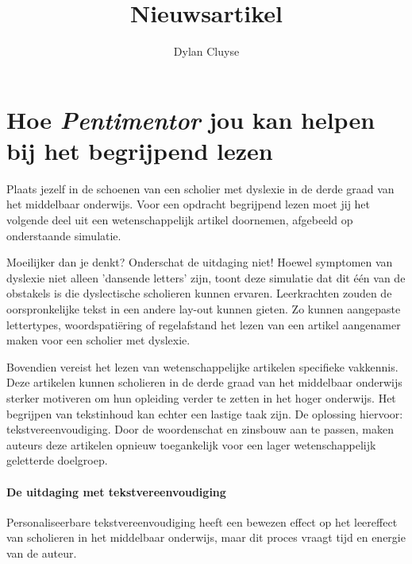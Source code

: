 \documentclass[a4paper,9pt,twoside]{report}
\title{Nieuwsartikel}
\author{Dylan {Cluyse}}
\begin{document}
	
\chapter{Hoe \textit{Pentimentor} jou kan helpen bij het begrijpend lezen}

\noindent Plaats jezelf in de schoenen van een scholier met dyslexie in de derde graad van het middelbaar onderwijs. Voor een opdracht begrijpend lezen moet jij het volgende deel uit een wetenschappelijk artikel doornemen, afgebeeld op onderstaande simulatie.

\begin{figure}[H]
\end{figure}

\noindent Moeilijker dan je denkt? Onderschat de uitdaging niet! Hoewel symptomen van dyslexie niet alleen 'dansende letters'  zijn, toont deze simulatie dat dit één van de obstakels is die dyslectische scholieren kunnen ervaren. Leerkrachten zouden de oorspronkelijke tekst in een andere lay-out kunnen gieten. Zo kunnen aangepaste lettertypes, woordspatiëring of regelafstand het lezen van een artikel aangenamer maken voor een scholier met dyslexie.

\medspace

\noindent Bovendien vereist het lezen van wetenschappelijke artikelen specifieke vakkennis. Deze artikelen kunnen scholieren in de derde graad van het middelbaar onderwijs sterker motiveren om hun opleiding verder te zetten in het hoger onderwijs. Het begrijpen van tekstinhoud kan echter een lastige taak zijn. De oplossing hiervoor: tekstvereenvoudiging. Door de woordenschat en zinsbouw aan te passen, maken auteurs deze artikelen opnieuw toegankelijk voor een lager wetenschappelijk geletterde doelgroep. 

\subsubsection{De uitdaging met tekstvereenvoudiging}

\noindent Personaliseerbare tekstvereenvoudiging heeft een bewezen effect op het leereffect van scholieren in het middelbaar onderwijs, maar dit proces vraagt tijd en energie van de auteur.
\end{document}
